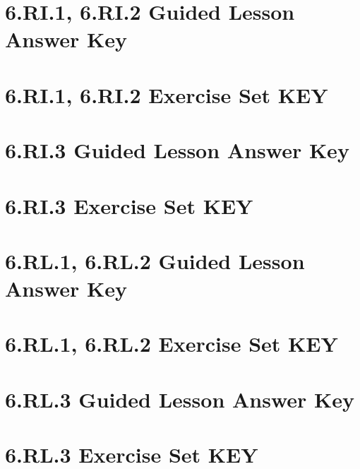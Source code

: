 \documentclass[a4paper,12pt]{article}
\title{}
\date{}
\begin{document}

\hypertarget{toc}{}
\tableofcontents
\newpage

\pagestyle{fancy}

\newpage
\section{6.RI.1, 6.RI.2 Guided Lesson Answer Key}


\newpage
\section{6.RI.1, 6.RI.2 Exercise Set KEY}


\newpage
\section{6.RI.3 Guided Lesson Answer Key}


\newpage
\section{6.RI.3 Exercise Set KEY}


\newpage
\section{6.RL.1, 6.RL.2 Guided Lesson Answer Key}


\newpage
\section{6.RL.1, 6.RL.2 Exercise Set KEY}


\newpage
\section{6.RL.3 Guided Lesson Answer Key}


\newpage
\section{6.RL.3 Exercise Set KEY}

\end{document}
